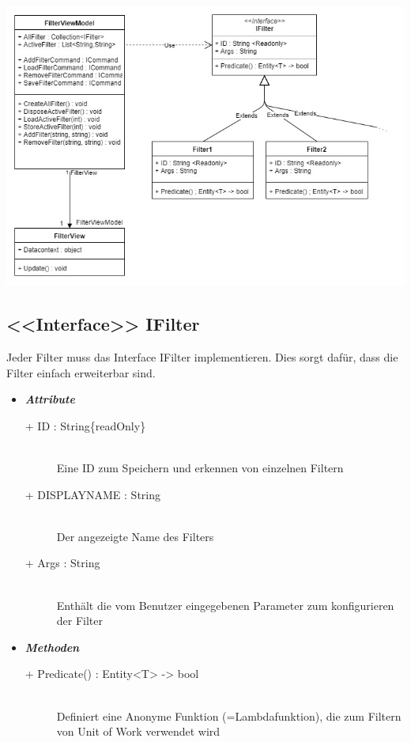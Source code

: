 \documentclass[13pt]{scrreprt}
\begin{document}
	\includegraphics[scale=0.5,center]{FilterModule.jpg}
	\newpage
	\subsection{<<Interface>> IFilter}
	Jeder Filter muss das Interface IFilter implementieren. Dies sorgt dafür, dass die Filter einfach erweiterbar sind.
	\begin{itemize}[label = {$\circ$}]
		\item {\large \textbf{\textit{Attribute}}\par}
		\begin{description}
			\item [+ ID : String\{readOnly\}] \hfill \\Eine ID zum Speichern und erkennen von einzelnen Filtern
			\item [+ DISPLAYNAME : String] \hfill \\Der angezeigte Name des Filters
			\item [+ Args : String] \hfill \\Enthält die vom Benutzer eingegebenen Parameter zum konfigurieren der Filter
		\end{description}
		\item {\large \textbf{\textit{Methoden}}\par}
		\begin{description}
			\item [+ Predicate() : Entity<T> -> bool] \hfill \\ Definiert eine Anonyme Funktion (=Lambdafunktion), die zum Filtern von Unit of Work verwendet wird
		\end{description}
	\end{itemize}
	
\end{document}
